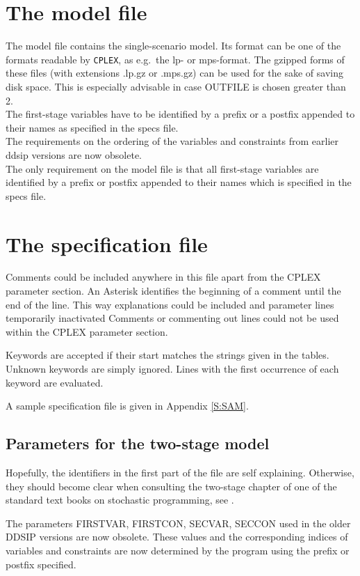 \documentclass[11pt,draft]{article}
\newcommand{\+}{{\ti{+}}}
\newcommand{\1}{{\ti{1}}}
\begin{document}
\section{The model file}
The model file contains the single-scenario model. Its format can be one of the formats readable by
\texttt{CPLEX}, as e.g.\ the lp- or mps-format. The gzipped forms of these files (with extensions .lp.gz or .mps.gz)
can be used for the sake of saving disk space. This is especially advisable in case OUTFILE is chosen greater than 2.\\
The first-stage variables have to be identified by a prefix or a postfix appended to their names
as specified in the specs file.\\
The requirements on the ordering of the variables and constraints from earlier ddsip versions are now obsolete.\\
The only requirement on the model file is that all first-stage variables are identified by a prefix or postfix appended to their names
which is specified in the specs file.
%
\section{The specification file}
Comments could be included anywhere in this file apart from the CPLEX parameter section.
An Asterisk identifies the beginning of a comment until the end of the line.
This way explanations could be included and parameter lines temporarily inactivated
Comments or commenting out lines could not be used within the CPLEX parameter section.

Keywords are accepted if their start matches the strings given in the tables.
Unknown keywords are simply ignored. Lines with the first occurrence of each keyword are evaluated.

A sample specification file is given in Appendix \ref{S:SAM}. %
\subsection{Parameters for the two-stage model}
Hopefully, the identifiers in the first part of the file are self explaining. Otherwise, they should
become clear when consulting the two-stage chapter of one of the standard text books on stochastic
programming, see \cite{bir,kal,pre}.

The parameters FIRSTVAR, FIRSTCON, SECVAR, SECCON  used in the older DDSIP versions are now obsolete.
These values and the corresponding indices of variables and constraints are now determined by the program
using the prefix or postfix specified.
\end{document}
